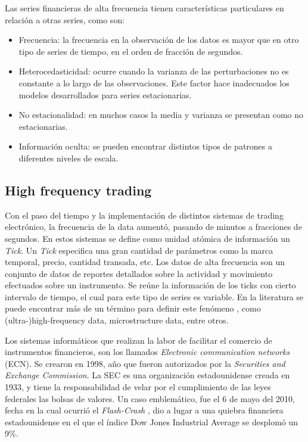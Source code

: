Las series financieras de alta frecuencia tienen características particulares
en relación a otras series, como son: 
\begin{itemize}
	\item Frecuencia: la frecuencia en la observación de los datos es mayor que
en otro tipo de series de tiempo, en el orden de fracción de segundos.
	\item Heterocedasticidad: ocurre cuando la varianza de las perturbaciones
no es constante a lo largo de las observaciones.  Este factor hace inadecuados
los modelos desarrollados para series estacionarias.
	\item No estacionalidad: en muchos casos la media y varianza se presentan
como no estacionarias.
	\item Información oculta: se pueden encontrar distintos tipos de patrones a
diferentes niveles de escala.
\end{itemize}

\subsection{High frequency trading}

Con el paso del tiempo y la implementación de distintos sistemas de trading
electrónico, la frecuencia de la data aumentó, pasando de minutos a fracciones
de segundos.  En estos sistemas se define como unidad atómica de información un
\emph{Tick}. Un \emph{Tick} especifica una gran cantidad de parámetros como la
marca temporal, precio, cantidad transada, etc.  Los datos de alta frecuencia
son un conjunto de datos de reportes detallados sobre la actividad y movimiento
efectuados sobre un instrumento. Se reúne la información de los ticks con
cierto intervalo de tiempo, el cual para este tipo de series es variable. En la
literatura se puede encontrar más de un término para definir este fenómeno
\cite{ei2007quantitative}, como (ultra-)high-frequency data, microstructure
data, entre otros.

Los sistemas informáticos que realizan la labor de facilitar el comercio de
instrumentos financieros, son los llamados \emph{Electronic communication
networks} (ECN).  Se crearon en 1998, año que fueron autorizados por la
\emph{Securities and Exchange Commission}. La SEC \cite{hasbrouck2004economic}
es una organización estadounidense creada en 1933, y tiene la responsabilidad
de velar por el cumplimiento de las leyes federales las bolsas de valores. Un
caso emblemático, fue el 6 de mayo del 2010, fecha en la cual ocurrió el
\emph{Flash-Crash} \cite{arndt2011high}, dio a lugar a una quiebra financiera
estadounidense en el que el índice Dow Jones Industrial Average se desplomó un
9\%.

